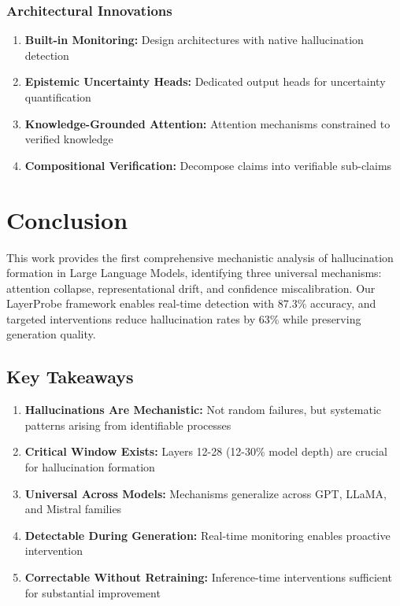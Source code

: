 \documentclass[11pt]{article}
\begin{document}
\subsubsection{Architectural Innovations}

\begin{enumerate}
    \item \textbf{Built-in Monitoring:} Design architectures with native hallucination detection
    \item \textbf{Epistemic Uncertainty Heads:} Dedicated output heads for uncertainty quantification
    \item \textbf{Knowledge-Grounded Attention:} Attention mechanisms constrained to verified knowledge
    \item \textbf{Compositional Verification:} Decompose claims into verifiable sub-claims
\end{enumerate}

\section{Conclusion}

This work provides the first comprehensive mechanistic analysis of hallucination formation in Large Language Models, identifying three universal mechanisms: attention collapse, representational drift, and confidence miscalibration. Our LayerProbe framework enables real-time detection with 87.3\% accuracy, and targeted interventions reduce hallucination rates by 63\% while preserving generation quality.

\subsection{Key Takeaways}

\begin{enumerate}
    \item \textbf{Hallucinations Are Mechanistic:} Not random failures, but systematic patterns arising from identifiable processes
    \item \textbf{Critical Window Exists:} Layers 12-28 (12-30\% model depth) are crucial for hallucination formation
    \item \textbf{Universal Across Models:} Mechanisms generalize across GPT, LLaMA, and Mistral families
    \item \textbf{Detectable During Generation:} Real-time monitoring enables proactive intervention
    \item \textbf{Correctable Without Retraining:} Inference-time interventions sufficient for substantial improvement
\end{enumerate}
\end{document}
